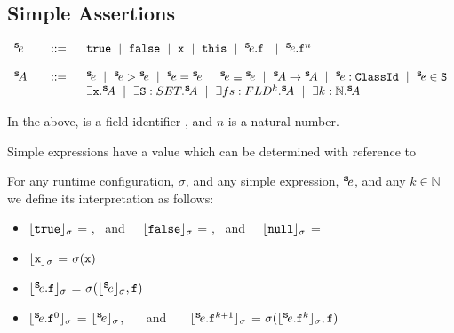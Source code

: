  \subsection{Simple Assertions}
 \label{def:simple_assertion}
 \begin{definition} $ $ \\
 
 $\begin{array}{lcl}
 \SE & ::= &  \prg{true}  \ \mid\ \prg{false}  \ \mid \ \prg{x}  \ \mid\ \prg{this}  \ \mid \ \SE.\prg{f} \    \ \mid \ \SE.\prg{f}^n \  \\
 ~ \\
  \SA\ &\ \  ::=\ \  & \SE  \ \mid \ \SE > \SE \ \mid \  \SE=\SE  \ \mid \ \SE \equiv \SE \ \mid  \ \SA \rightarrow \SA \ \mid \   \SE:\prg{ClassId}  \ \mid \   
    \SE\in\prg{S}  \\
 & &   \exists \prg{x}.\SA  \ \mid \  \exists \prg{S}:SET.\SA  \ \mid \  \exists fs:FLD^k.\SA
 \ \mid \  \exists k:\mathbb{N}.\SA  
\end{array}$

\noindent
In the above,  is a field identifier , and  $n$ is a natural number.
\end{definition} 

Simple expressions have a value which can be determined with reference to 

\begin{definition}[Interpretations]

For any runtime configuration, $\sigma$, and any simple expression, ${^{\small{{\mbox{\tt{s}}}}}\!e}$, and any $k\in \mathbb{N}$ we define its interpretation as follows:

\begin{itemize}
     \item 
  $\interp {}{\sigma}$ = \prg{true}, \ and \ \    $\interp {}{\sigma}$ = \prg{false}, \ and \ \ 
   $\interp {}{\sigma}$ = \prg{null}
  \item
  ${\lfloor{ {{\mbox{\tt{x}}}}}\rfloor_{\sigma}}$ = $\sigma({\mbox{\tt{x}}})$
  \item
  ${\lfloor{ {\ensuremath{{^{\small{{\mbox{\tt{s}}}}}\!e}}.{\mbox{\tt{f}}}}}\rfloor_{\sigma}}$ = $\sigma({{\lfloor{ {\ensuremath{{^{\small{{\mbox{\tt{s}}}}}\!e}}}}\rfloor_{\sigma}}}, {\mbox{\tt{f}}})$
  \item
    ${\lfloor{ {\ensuremath{{^{\small{{\mbox{\tt{s}}}}}\!e}}.{\mbox{\tt{f}}}^0}}\rfloor_{\sigma}}$ =  ${\lfloor{ {\ensuremath{{^{\small{{\mbox{\tt{s}}}}}\!e}}}}\rfloor_{\sigma}}$, \ \ \ and \ \ \ ${\lfloor{ {\ensuremath{{^{\small{{\mbox{\tt{s}}}}}\!e}}.{\mbox{\tt{f}}}^{k+1}}}\rfloor_{\sigma}}$ =  $\sigma({{\lfloor{ {\ensuremath{{^{\small{{\mbox{\tt{s}}}}}\!e}}.{\mbox{\tt{f}}}^k}}\rfloor_{\sigma}}}, {\mbox{\tt{f}}})$
   \end{itemize}
\end{definition}

